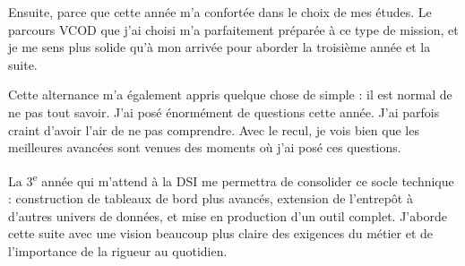 \documentclass[11pt,a4paper]{article}
\begin{document}
Ensuite, parce que cette année m'a confortée dans le choix de mes études. Le parcours VCOD que j'ai choisi m'a parfaitement préparée à ce type de mission, et je me sens plus solide qu'à mon arrivée pour aborder la troisième année et la suite.

Cette alternance m'a également appris quelque chose de simple : il est normal de ne pas tout savoir. J'ai posé énormément de questions cette année. J'ai parfois craint d'avoir l'air de ne pas comprendre. Avec le recul, je vois bien que les meilleures avancées sont venues des moments où j'ai posé ces questions.

La 3\textsuperscript{e} année qui m'attend à la DSI me permettra de consolider ce socle technique : construction de tableaux de bord plus avancés, extension de l'entrepôt à d'autres univers de données, et mise en production d'un outil complet. J'aborde cette suite avec une vision beaucoup plus claire des exigences du métier et de l'importance de la rigueur au quotidien.

\newpage
\end{document}
